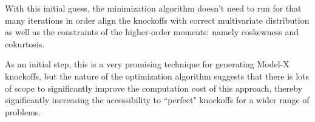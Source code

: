 \documentclass[review]{elsarticle}
\begin{document}
 With this initial guess, the minimization algorithm doesn't need to run for that many iterations in order align the knockoffs with correct multivariate distribution as well as the constraints of the higher-order moments: namely coskewness and cokurtosis.
 
 As an initial step, this is a very promising technique for generating Model-X knockoffs, but the nature of the optimization algorithm suggests that there is lots of scope to significantly improve the computation cost of this approach, thereby significantly increasing the accessibility to ``perfect" knockoffs for a wider range of problems.
 
 
%
\end{document}
